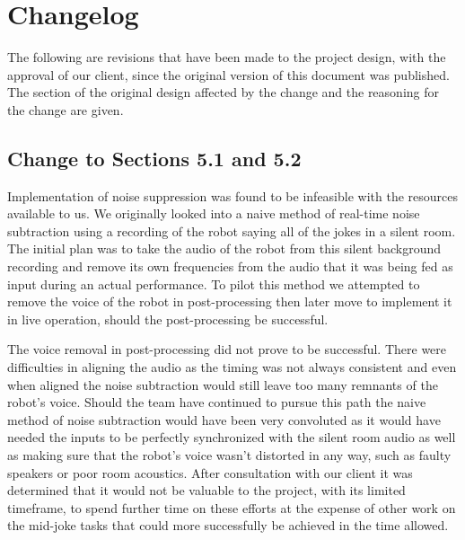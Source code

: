 \documentclass[onecolumn, draftclsnofoot,10pt, compsoc]{IEEEtran}
\begin{document}
\newpage

\section{Changelog}
The following are revisions that have been made to the project design, with the approval of our client, since the original version of this document was published. The section of the original design affected by the change and the reasoning for the change are given.

\subsection{Change to Sections 5.1 and 5.2}
Implementation of noise suppression was found to be infeasible with the resources available to us. We originally looked into a naive method of real-time noise subtraction using a recording of the robot saying all of the jokes in a silent room. The initial plan was to take the audio of the robot from this silent background recording and remove its own frequencies from the audio that it was being fed as input during an actual performance. To pilot this method we attempted to remove the voice of the robot in post-processing then later move to implement it in live operation, should the post-processing be successful.\par
\vspace{.3cm}
\noindent The voice removal in post-processing did not prove to be successful. There were difficulties in aligning the audio as the timing was not always consistent and even when aligned the noise subtraction would still leave too many remnants of the robot's voice. Should the team have continued to pursue this path the naive method of noise subtraction would have been very convoluted as it would have needed the inputs to be perfectly synchronized with the silent room audio as well as making sure that the robot's voice wasn’t distorted in any way, such as faulty speakers or poor room acoustics. After consultation with our client it was determined that it would not be valuable to the project, with its limited timeframe, to spend further time on these efforts at the expense of other work on the mid-joke tasks that could more successfully be achieved in the time allowed.
\end{document}
